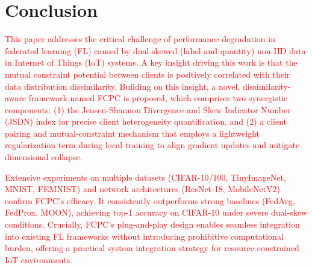 \documentclass[journal,twoside,web]{ieeecolor}
\newcommand{\rev}[1]{\textcolor{red}{#1}}
\begin{document}



\section{Conclusion}
\rev{This paper addresses the critical challenge of performance degradation in federated learning (FL) caused by dual-skewed (label and quantity) non-IID data in Internet of Things (IoT) systems. A key insight driving this work is that the mutual constraint potential between clients is positively correlated with their data distribution dissimilarity. Building on this insight, a novel, dissimilarity-aware framework named FCPC is proposed, which comprises two synergistic components: (1) the Jensen-Shannon Divergence and Skew Indicator Number (JSDN) index for precise client heterogeneity quantification, and (2) a client pairing and mutual-constraint mechanism that employs a lightweight regularization term during local training to align gradient updates and mitigate dimensional collapse.}

\rev{Extensive experiments on multiple datasets (CIFAR-10/100, TinyImageNet, MNIST, FEMNIST) and network architectures (ResNet-18, MobileNetV2) confirm FCPC's efficacy. It consistently outperforms strong baselines (FedAvg, FedProx, MOON), achieving top-1 accuracy on CIFAR-10 under severe dual-skew conditions. Crucially, FCPC's plug-and-play design enables seamless integration into existing FL frameworks without introducing prohibitive computational burden, offering a practical system integration strategy for resource-constrained IoT environments.}
\end{document}
